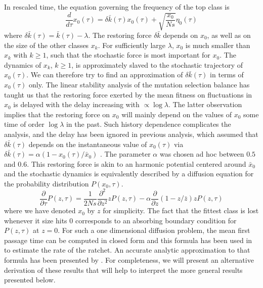 \documentclass[rmp,preprint]{revtex4}
\newcommand{\x}{x}
\newcommand{\xs}{\bar{\x}}
\newcommand{\xz}{z}
\newcommand{\xzs}{\bar{\xz}}
\newcommand{\mk}{\bar{k}}
\newcommand{\dk}{\delta \bar{k}}
\begin{document}
In rescaled time, the equation governing the frequency of the top class is
\begin{equation}
\label{eq:topbin_langevin_nonlocal}
\frac{d}{d\tau} \x_0(\tau) = \dk(\tau)\x_0(\tau)+ \sqrt{\frac{\x_0}{Ns}}\eta_0(\tau)
\end{equation}
where $\dk(\tau)=\mk(\tau) - \lambda$.
The restoring force $\dk$ depends on $\x_0$, as well as on the size of the other classes $\x_k$. For sufficiently large $\lambda$,  $\x_0$ is much smaller than $\x_k$ with $k\geq 1$, such that the stochastic force is most important for $\x_0$. The dynamics of $\x_k$, $k\geq1$, is approximately slaved to the stochastic trajectory of $\x_0(\tau)$. We can therefore try to find an approximation of $\dk(\tau)$ in terms of $\x_0(\tau)$ only. The linear stability analysis of the mutation selection balance has taught us that the restoring force exerted by the mean fitness on fluctuations in $\x_0$ is delayed with the delay increasing with $\propto \log \lambda$. The latter observation implies that the restoring force on $\x_0$ will mainly depend on the values of $\x_0$ some time of order $\log \lambda$ in the past. Such history dependence complicates the analysis, and the delay has been ignored in previous analysis, which assumed that $\dk(\tau)$ depends on the instantaneous value of $\x_0(\tau)$ via $\dk(\tau)= \alpha (1-\x_0(\tau)/\xs_0)$ \citep{Stephan:1993p42929,Gordo:2000p42688,Jain:2008p45047}. The parameter $\alpha$ was chosen ad hoc between $0.5$ and $0.6$. This restoring force is akin to an harmonic potential centered around $\xs_0$ and the stochastic dynamics is equivalently described by a diffusion equation for the probability distribution $P(\x_0,\tau)$. 
\begin{equation}
\label{eq:diffusion}
\frac{\partial}{\partial \tau}P(\xz,\tau) = \frac{1}{2Ns}\frac{\partial^2}{\partial \xz^2} \xz P(\xz,\tau) - \alpha\frac{\partial}{\partial \xz}  (1-\xz/\xzs)\xz P(\xz,\tau)
\end{equation}
where we have denoted $\x_0$ by $\xz$ for simplicity. The fact that the fittest class is lost whenever it size hits 0 corresponds to an absorbing boundary condition for $P(\xz,\tau)$ at $\xz=0$. For such a one dimensional diffusion problem, the mean first passage time can be computed in closed form \citep{WGardiner:2004p36981} and this formula has been used in \citep{Stephan:1993p42929,Gordo:2000p42688} to estimate the rate of the ratchet. An accurate analytic approximation to that formula has been presented by \citet{Jain:2008p45047}. For completeness, we will present an alternative derivation of these results that will help to interpret the more general results presented below.
\end{document}
